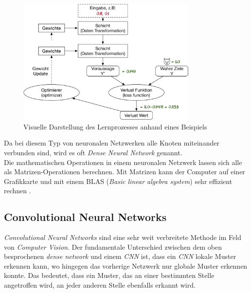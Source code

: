 \begin{figure}[hbt]
	\centering
		\includegraphics[width=0.8\textwidth]{assets/anatomy.png}
	\caption{Visuelle Darstellung des Lernprozesses anhand eines Beispiels}
	\label{img:anatomy}
\end{figure}

Da bei diesem Typ von neuronalen Netzwerken alle Knoten miteinander verbunden sind, wird es oft \textit{Dense Neural Network} genannt.
\\
Die mathematischen Operationen in einem neuronalen Netzwerk lassen sich alle als Matrizen-Operationen berechnen. Mit Matrizen kann der Computer auf einer Grafikkarte und mit einem BLAS (\textit{Basic linear algebra system}) sehr effizient rechnen \parencite{neuronale_netze} .


\subsection{Convolutional Neural Networks}
\textit{Convolutional Neural Networks} sind eine sehr weit verbreitete Methode im Feld von \textit{Computer Vision}. Der fundamentale Unterschied zwischen dem oben besprochenen \textit{dense network} und einem \textit{CNN} ist, dass ein \textit{CNN} lokale Muster erkennen kann, wo hingegen das vorherige Netzwerk nur globale Muster erkennen konnte. Das bedeutet, dass ein Muster, das an einer bestimmten Stelle angetroffen wird, an jeder anderen Stelle ebenfalls erkannt wird. \parencite{chollet}

